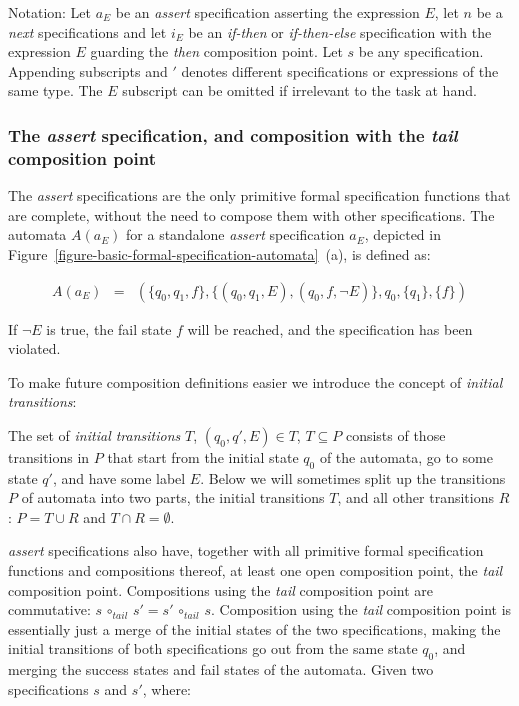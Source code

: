Notation: Let $a_E$ be an \textit{assert} specification asserting the
expression $E$, let $n$ be a \textit{next} specifications and let $i_E$ be an
\textit{if-then} or \textit{if-then-else} specification with the expression $E$
guarding the \textit{then} composition point. Let $s$ be any specification.
Appending subscripts and $'$ denotes different specifications or expressions of
the same type. The $E$ subscript can be omitted if irrelevant to the task at
hand.

\subsubsection{The \textit{assert} specification, and composition with the
\textit{tail} composition point}

The \textit{assert} specifications are the only primitive formal specification
functions that are complete, without the need to compose them with other
specifications. The automata $A(a_E)$ for a standalone \textit{assert}
specification $a_E$, depicted in
Figure~\ref{figure-basic-formal-specification-automata}~(a), is defined as:

\medskip
\[
  \begin{array}{rcl}
    A(a_E) & = & (\{q_0, q_1, f\}, \{(q_0, q_1, E), (q_0, f, \neg E)\}, q_0, \{q_1\}, \{f\})
  \end{array}
\]
\medskip

If $\neg E$ is true, the fail state $f$ will be reached, and the specification
has been violated.

To make future composition definitions easier we introduce the concept of
\textit{initial transitions}:

\begin{mydef}\label{def-initial-transitions}
The set of \textit{initial transitions} $T$, $(q_0, q', E) \in T$,
$T \subseteq P$ consists of those transitions in $P$ that start from the
initial state $q_0$ of the automata, go to some state $q'$, and have some label
$E$. Below we will sometimes split up the transitions $P$ of automata into two
parts, the initial transitions $T$, and all other transitions $R$: $P = T \cup
R$ and $T \cap R = \emptyset$.
\end{mydef}

\textit{assert} specifications also have, together with all primitive formal
specification functions and compositions thereof, at least one open composition
point, the \textit{tail} composition point. Compositions using the
\textit{tail} composition point are commutative: $s \, \circ_{tail} \, s' = s'
\, \circ_{tail} \, s$. Composition using the \textit{tail} composition point
is essentially just a merge of the initial states of the two specifications,
making the initial transitions of both specifications go out from the same
state $q_0$, and merging the success states and fail states of the automata.
Given two specifications $s$ and $s'$, where:

